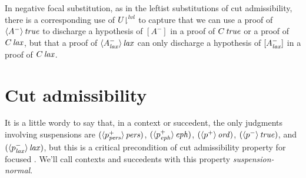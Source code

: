 
\noindent
In negative focal substitution, as in the leftist substitutions of
cut admissibility, there is a corresponding use of
${U}{\downharpoonright}^{{\it lvl}}$ to capture that we can use a proof of
${\langle {A^-} \rangle}\,{{\it true}}$ to discharge a hypothesis of ${[A^-]}$ in a proof of
${C}\,{{\it true}}$ or a proof of ${C}\,{{\it lax}}$, but that a proof of
${\langle {A^-_{\it lax}} \rangle}\,{{\it lax}}$ can only discharge a hypothesis of 
${[A^-_{\it lax}]}$ in a proof
of ${C}\,{{\it lax}}$. 



\section{Cut admissibility}
\label{sec:ord-cut}

It is a little wordy to say that, in a context or succedent, the only
judgments involving suspensions are $({\langle {p^+_{\it pers}} \rangle}\,{{\it pers}})$,
$({\langle {p^+_{\it eph}} \rangle}\,{{\it eph}})$, $({\langle {p^+} \rangle}\,{{\it ord}})$,
$({\langle {p^-} \rangle}\,{{\it true}})$, and $({\langle {p^-_{\it lax}} \rangle}\,{{\it lax}})$, but this is a
critical precondition of cut admissibility property for focused
\ollll. We'll call contexts and succedents with this property {\it
  suspension-normal}.

